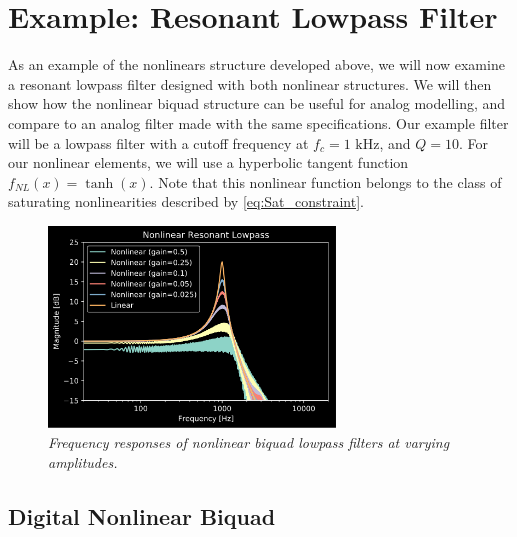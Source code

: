 \documentclass[twoside,a4paper]{article}
\begin{document}
\section{Example: Resonant Lowpass Filter}
%
As an example of the nonlinears structure developed above,
we will now examine a resonant lowpass filter
designed with both nonlinear structures. We will then show how the
nonlinear biquad structure can be useful for analog modelling,
and compare to an analog filter made with the same specifications.
\newline\newline
Our example filter will be a lowpass filter with a cutoff frequency
at $f_c = 1\text{ kHz}$, and $Q=10$. For our nonlinear elements, we
will use a hyperbolic tangent function $f_{NL}(x) = \tanh (x)$.
Note that this nonlinear function belongs to the class of
saturating nonlinearities described by \cref{eq:Sat_constraint}.
%
\begin{figure}[h]
    \center
    \includegraphics[width=3in]{../Pics/NL-LPF.png}
    \caption{\label{NL-LPF-freq}{\it Frequency responses of nonlinear biquad lowpass
                                    filters at varying amplitudes.}}
\end{figure}
%

\subsection{Digital Nonlinear Biquad}
\end{document}
